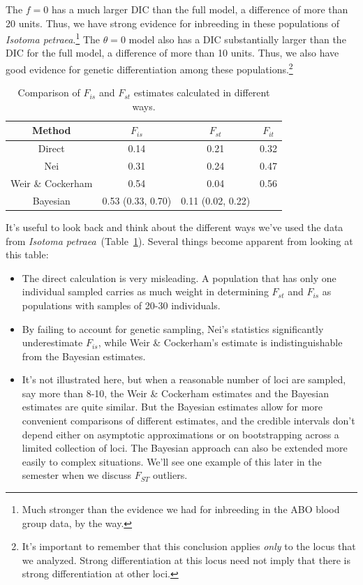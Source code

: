The $f=0$ has a much larger DIC than the full model, a difference of
more than 20 units. Thus, we have strong evidence for inbreeding in
these populations of {\it Isotoma petraea}.\footnote{Much stronger
  than the evidence we had for inbreeding in the ABO blood group data,
  by the way.} The $\theta = 0$ model also has a DIC substantially
larger than the DIC for the full model, a difference of more than 10
units. Thus, we also have good evidence for genetic differentiation
among these populations.\footnote{It's important to remember that this
  conclusion applies {\it only\/} to the locus that we
  analyzed. Strong differentiation at this locus need not imply that
  there is strong differentiation at other loci.}

\begin{table}
\begin{center}
\begin{tabular}{c|ccc}
\hline\hline
Method & $F_{is}$ & $F_{st}$ & $F_{it}$ \\
\hline
Direct            & 0.14 & 0.21 & 0.32 \\
Nei               & 0.31 & 0.24 & 0.47 \\
Weir \& Cockerham & 0.54 & 0.04 & 0.56 \\
Bayesian          & 0.53 (0.33, 0.70) & 0.11 (0.02, 0.22) \\
\hline
\end{tabular}
\end{center}
\caption{Comparison of $F_{is}$ and $F_{st}$ estimates calculated in
  different ways.}\label{table:compare}
\end{table}

It's useful to look back and think about the different ways we've used
the data from {\it Isotoma
  petraea}~(Table~\ref{table:compare}). Several things become apparent
from looking at this table:

\begin{itemize}

\item The direct calculation is very misleading. A population that
  has only one individual sampled carries as much weight in
  determining $F_{st}$ and $F_{is}$ as populations with samples of
  20-30 individuals.

\item By failing to account for genetic sampling, Nei's statistics
  significantly underestimate $F_{is}$, while Weir \& Cockerham's
  estimate is indistinguishable from the Bayesian estimates.

\item It's not illustrated here, but when a reasonable number of loci
  are sampled, say more than 8-10, the Weir \& Cockerham estimates and
  the Bayesian estimates are quite similar. But the Bayesian estimates
  allow for more convenient comparisons of different estimates, and
  the credible intervals don't depend either on asymptotic
  approximations or on bootstrapping across a limited collection of
  loci. The Bayesian approach can also be extended more easily to
  complex situations. We'll see one example of this later in the
  semester when we discuss $F_{ST}$ outliers.

\end{itemize}

